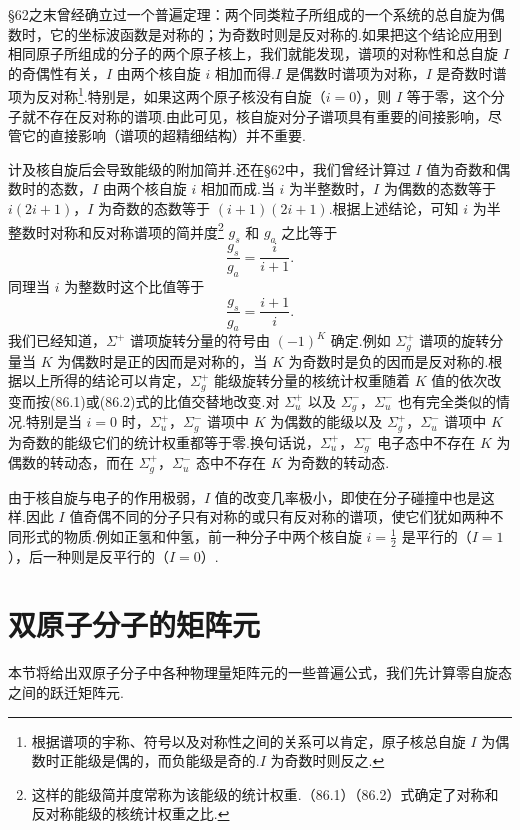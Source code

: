 §62之末曾经确立过一个普遍定理：两个同类粒子所组成的一个系统的总自旋为偶数时，它的坐标波函数是对称的；为奇数时则是反对称的.如果把这个结论应用到相同原子所组成的分子的两个原子核上，我们就能发现，谱项的对称性和总自旋 $I$ 的奇偶性有关，$I$ 由两个核自旋 $i$ 相加而得.$I$ 是偶数时谱项为对称，$I$ 是奇数时谱项为反对称\footnote{根据谱项的宇称、符号以及对称性之间的关系可以肯定，原子核总自旋 $I$ 为偶数时正能级是偶的，而负能级是奇的.$I$ 为奇数时则反之.}.特别是，如果这两个原子核没有自旋（$i=0$），则 $I$ 等于零，这个分子就不存在反对称的谱项.由此可见，核自旋对分子谱项具有重要的间接影响，尽管它的直接影响（谱项的超精细结构）并不重要.

计及核自旋后会导致能级的附加简并.还在§62中，我们曾经计算过 $I$ 值为奇数和偶数时的态数，$I$ 由两个核自旋 $i$ 相加而成.当 $i$ 为半整数时，$I$ 为偶数的态数等于 $i(2i+1)$，$I$ 为奇数的态数等于 $(i+1)(2i+1)$.根据上述结论，可知 $i$ 为半整数时对称和反对称谱项的简并度\footnote{这样的能级简并度常称为该能级的统计权重.（86.1）（86.2）式确定了对称和反对称能级的核统计权重之比.} $g_s$ 和 $g_a$ 之比等于
\begin{equation}
  \frac{g_s}{g_a}=\frac{i}{i+1}.
\end{equation}
同理当 $i$ 为整数时这个比值等于
\begin{equation}
  \frac{g_s}{g_a}=\frac{i+1}{i}.
\end{equation}
我们已经知道，$\Sigma^+$ 谱项旋转分量的符号由 $(-1)^K$ 确定.例如 $\Sigma_g^+$ 谱项的旋转分量当 $K$ 为偶数时是正的因而是对称的，当 $K$ 为奇数时是负的因而是反对称的.根据以上所得的结论可以肯定，$\Sigma_g^+$ 能级旋转分量的核统计权重随着 $K$ 值的依次改变而按(86.1)或(86.2)式的比值交替地改变.对 $\Sigma_u^+$ 以及 $\Sigma_g^-$，$\Sigma_u^-$ 也有完全类似的情况.特别是当 $i=0$ 时，$\Sigma_u^+$，$\Sigma_g^-$ 谱项中 $K$ 为偶数的能级以及 $\Sigma_g^+$，$\Sigma_u^-$ 谱项中 $K$ 为奇数的能级它们的统计权重都等于零.换句话说，$\Sigma_u^+$，$\Sigma_g^-$ 电子态中不存在 $K$ 为偶数的转动态，而在 $\Sigma_g^+$，$\Sigma_u^-$ 态中不存在 $K$ 为奇数的转动态.

由于核自旋与电子的作用极弱，$I$ 值的改变几率极小，即使在分子碰撞中也是这样.因此 $I$ 值奇偶不同的分子只有对称的或只有反对称的谱项，使它们犹如两种不同形式的物质.例如正氢和仲氢，前一种分子中两个核自旋 $i=\frac{1}{2}$ 是平行的（$I=1$），后一种则是反平行的（$I=0$）.

\section{双原子分子的矩阵元}

本节将给出双原子分子中各种物理量矩阵元的一些普遍公式，我们先计算零自旋态之间的跃迁矩阵元.

